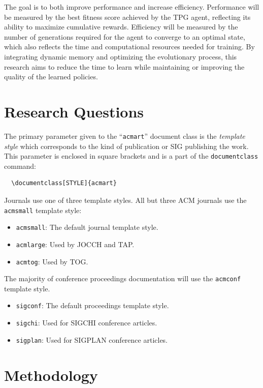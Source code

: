 \documentclass[sigconf]{acmart}
\begin{document}
The goal is to both improve performance and increase efficiency. Performance will be measured by the best fitness score achieved by the TPG agent, reflecting its ability to maximize cumulative rewards. Efficiency will be measured by the number of generations required for the agent to converge to an optimal state, which also reflects the time and computational resources needed for training. By integrating dynamic memory and optimizing the evolutionary process, this research aims to reduce the time to learn while maintaining or improving the quality of the learned policies.

\section{Research Questions}

The primary parameter given to the ``\verb|acmart|'' document class is
the {\itshape template style} which corresponds to the kind of publication
or SIG publishing the work. This parameter is enclosed in square
brackets and is a part of the {\verb|documentclass|} command:
\begin{verbatim}
  \documentclass[STYLE]{acmart}
\end{verbatim}

Journals use one of three template styles. All but three ACM journals
use the {\verb|acmsmall|} template style:
\begin{itemize}
\item {\texttt{acmsmall}}: The default journal template style.
\item {\texttt{acmlarge}}: Used by JOCCH and TAP.
\item {\texttt{acmtog}}: Used by TOG.
\end{itemize}

The majority of conference proceedings documentation will use the {\verb|acmconf|} template style.
\begin{itemize}
\item {\texttt{sigconf}}: The default proceedings template style.
\item{\texttt{sigchi}}: Used for SIGCHI conference articles.
\item{\texttt{sigplan}}: Used for SIGPLAN conference articles.
\end{itemize}

\section{Methodology}
\end{document}

